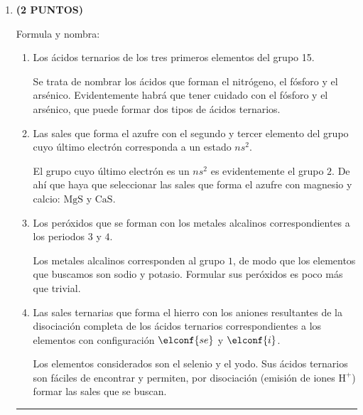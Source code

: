 \documentclass[a4paper,14pt]{extarticle}
\newcommand*\chem[1]{\ensuremath{\mathrm{#1}}}
\newcommand{\halmos}{
\vspace*{-3ex}

\begin{flushright}
\rule{1mm}{2.5mm} \end{flushright}
}
\renewcommand{\qed}{\halmos}
\begin{document}
\begin{enumerate}
  \setlength\itemsep{1.5em}
    
    
    \item \textbf{(2 PUNTOS)} 
    
    Formula y nombra:
    		\begin{enumerate}[label=\alph*)]
    			\item Los ácidos ternarios de los tres primeros elementos del grupo 15.
    			\begin{mdframed}[backgroundcolor=brown!10]  
    			Se trata de nombrar los ácidos que forman el nitrógeno, el fósforo y el arsénico. Evidentemente habrá que tener cuidado con el fósforo y el arsénico, que puede formar dos tipos de ácidos ternarios.
    			\end{mdframed}
    			\item Las sales que forma el azufre con el segundo y tercer elemento del grupo cuyo último electrón corresponda a un estado $ns^2$.
    			\begin{mdframed}[backgroundcolor=brown!10]  
    			El grupo cuyo último electrón es un $ns^2$ es evidentemente el grupo $2$. De ahí que haya que seleccionar las sales que forma el azufre con magnesio y calcio: $\chem{MgS}$ y $\chem{CaS}$.
    			\end{mdframed}
    			\item Los peróxidos que se forman con los metales alcalinos correspondientes a los periodos $3$ y $4$.
    			\begin{mdframed}[backgroundcolor=brown!10]  
    			Los metales alcalinos corresponden al grupo $1$, de modo que los elementos que buscamos son sodio y potasio. Formular sus peróxidos es poco más que trivial.
				\end{mdframed}    			 
    			\item Las sales ternarias que forma el hierro con los aniones resultantes de la disociación completa de los ácidos ternarios correspondientes a los elementos con configuración $\elconf{se}$ y $\elconf{i}$.
    			\begin{mdframed}[backgroundcolor=brown!10]  
    			Los elementos considerados son el selenio y el yodo. Sus ácidos ternarios son fáciles de encontrar y permiten, por disociación (emisión de iones $\chem{H^+}$) formar las sales que se buscan.
    			\end{mdframed}
    		\end{enumerate}
    		\qed
    	\newpage
    	

\end{enumerate}
\end{document}
